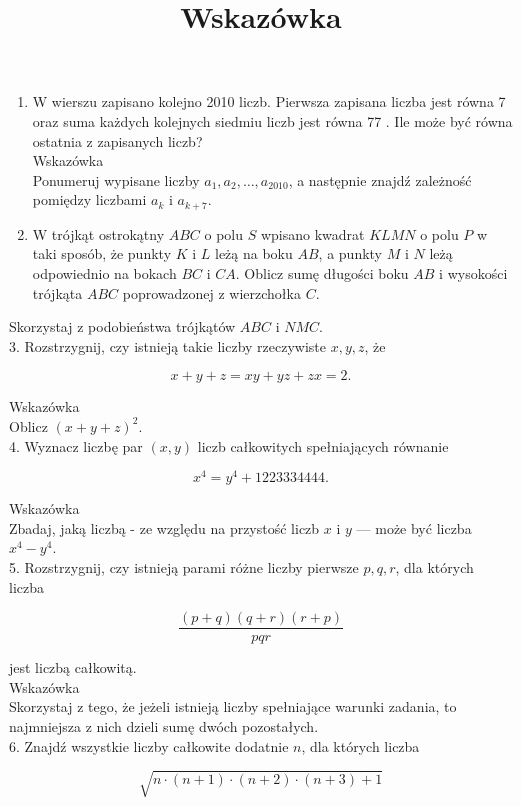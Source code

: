 \documentclass[10pt]{article}
\title{Wskazówka }
\author{}
\date{}
\begin{document}
\maketitle
\begin{enumerate}
  \item W wierszu zapisano kolejno 2010 liczb. Pierwsza zapisana liczba jest równa 7 oraz suma każdych kolejnych siedmiu liczb jest równa 77 . Ile może być równa ostatnia z zapisanych liczb?\\
Wskazówka\\
Ponumeruj wypisane liczby \(a_{1}, a_{2}, \ldots, a_{2010}\), a następnie znajdź zależność pomiędzy liczbami \(a_{k}\) i \(a_{k+7}\).
  \item W trójkąt ostrokątny \(A B C\) o polu \(S\) wpisano kwadrat \(K L M N\) o polu \(P\) w taki sposób, że punkty \(K\) i \(L\) leżą na boku \(A B\), a punkty \(M\) i \(N\) leżą odpowiednio na bokach \(B C\) i \(C A\). Oblicz sumę długości boku \(A B\) i wysokości trójkąta \(A B C\) poprowadzonej z wierzchołka \(C\).
\end{enumerate}

Skorzystaj z podobieństwa trójkątów \(A B C\) i \(N M C\).\\
3. Rozstrzygnij, czy istnieją takie liczby rzeczywiste \(x, y, z\), że

\[
x+y+z=x y+y z+z x=2 .
\]

Wskazówka\\
Oblicz \((x+y+z)^{2}\).\\
4. Wyznacz liczbę par \((x, y)\) liczb całkowitych spełniających równanie

\[
x^{4}=y^{4}+1223334444 .
\]

Wskazówka\\
Zbadaj, jaką liczbą - ze względu na przystość liczb \(x\) i \(y\) — może być liczba \(x^{4}-y^{4}\).\\
5. Rozstrzygnij, czy istnieją parami różne liczby pierwsze \(p, q, r\), dla których liczba

\[
\frac{(p+q)(q+r)(r+p)}{p q r}
\]

jest liczbą całkowitą.\\
Wskazówka\\
Skorzystaj z tego, że jeżeli istnieją liczby spełniające warunki zadania, to najmniejsza z nich dzieli sumę dwóch pozostałych.\\
6. Znajdź wszystkie liczby całkowite dodatnie \(n\), dla których liczba

\[
\sqrt{n \cdot(n+1) \cdot(n+2) \cdot(n+3)+1}
\]
\end{document}

